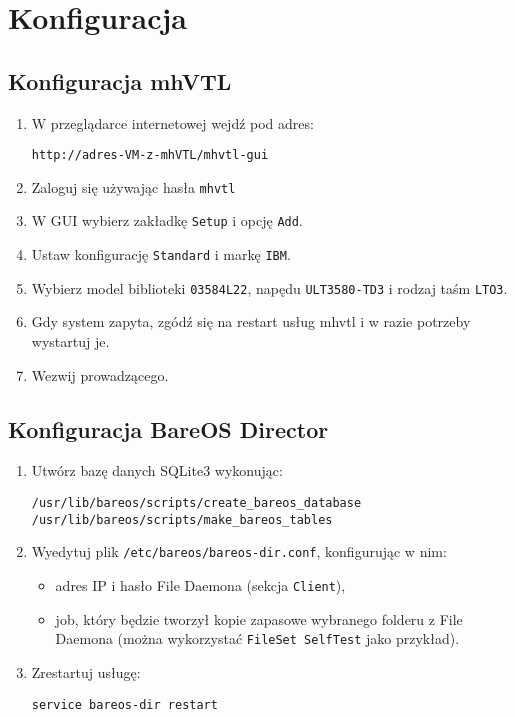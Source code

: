 \documentclass[polish]{article}
\begin{document}
\section{Konfiguracja}


\subsection*{Konfiguracja mhVTL}

\begin{enumerate}

\item W przeglądarce internetowej wejdź pod adres:
\begin{verbatim}
http://adres-VM-z-mhVTL/mhvtl-gui
\end{verbatim}

\item Zaloguj się używając hasła \texttt{mhvtl}

\item W GUI wybierz zakładkę \texttt{Setup} i opcję \texttt{Add}.

\item Ustaw konfigurację \texttt{Standard} i markę \texttt{IBM}.

\item Wybierz model biblioteki \texttt{03584L22}, napędu \texttt{ULT3580-TD3} i rodzaj taśm \texttt{LTO3}.

\item Gdy system zapyta, zgódź się na restart usług mhvtl i w razie potrzeby wystartuj je.

\item Wezwij prowadzącego.

\end{enumerate}


\subsection*{Konfiguracja BareOS Director}

\begin{enumerate}

\item Utwórz bazę danych SQLite3 wykonując:
\begin{verbatim}
/usr/lib/bareos/scripts/create_bareos_database
/usr/lib/bareos/scripts/make_bareos_tables
\end{verbatim}

\item Wyedytuj plik \texttt{/etc/bareos/bareos-dir.conf}, konfigurując w nim:
\begin{itemize}
\item adres IP i hasło File Daemona (sekcja \texttt{Client}),
\item job, który będzie tworzył kopie zapasowe wybranego folderu z File Daemona (można wykorzystać \texttt{FileSet SelfTest} jako przykład).
\end{itemize}

\item Zrestartuj usługę:
\begin{verbatim}
service bareos-dir restart
\end{verbatim}

\end{enumerate}
\end{document}
